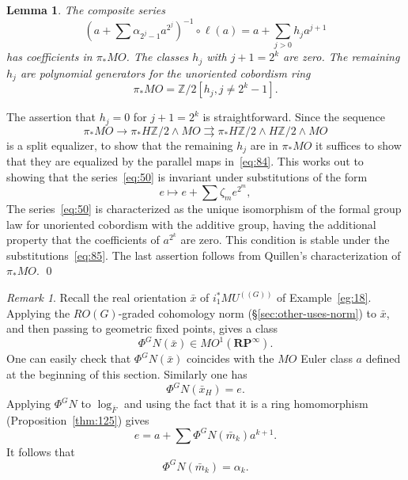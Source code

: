 \documentclass{amsart}
\newtheorem{lem}[equation]{Lemma}
\newtheorem{rem}[equation]{Remark}
\theoremstyle{definition}
\theoremstyle{remark}
\newtheorem{rem}[equation]{Remark}
\newenvironment{pf}{\bigskip{\em Proof:\/}}{\qed\medskip}
\newcommand{\Z}{{\mathbb Z}}
\newcommand{\rp}{\mathbf{RP}}
\newcommand{\mutn}[1]{MU^{(\!(#1)\!)}}
\newcommand{\norm}{N}
\newcommand{\gfp}[1]{\Phi^{#1}}
\newcommand{\phig}{\gfp{G}}
\newcommand{\gbar}{\bar}
\begin{document}
\begin{lem}
\label{thm:178}
The composite series
\begin{equation}\label{eq:50}
(a+\sum \alpha_{2^{j}-1} a^{2^{j}})^{-1}\circ \ell(a) = a +
\sum_{j>0} h_{j}a^{j+1}
\end{equation}
has coefficients in $\pi_{\ast}MO$.  The classes $h_{j}$ with
$j+1=2^{k}$ are zero.  The remaining $h_{j}$ are polynomial generators
for the unoriented cobordism ring
\begin{equation}\label{eq:51}
\pi_{\ast} MO =\Z/2[h_{j}, j\ne 2^{k}-1].
\end{equation}
\end{lem}


\begin{pf}
The assertion that $h_{j}=0$ for $j+1=2^{k}$ is straightforward.
Since the sequence
\begin{equation}
\label{eq:84}
\pi_{\ast}MO\to \pi_{\ast}H\Z/2\wedge MO \rightrightarrows
\pi_{\ast}H\Z/2\wedge H\Z/2\wedge MO
\end{equation}
is a split equalizer, to show that the remaining $h_{j}$ are in
$\pi_{\ast}MO$ it suffices to show that they are equalized by the
parallel maps in~\eqref{eq:84}.  This works out to showing that the
series~\eqref{eq:50} is invariant under substitutions of the form
\begin{equation}\label{eq:85}
e \mapsto e+ \sum \zeta_{m} e^{2^{m}},
\end{equation}
The series~\eqref{eq:50} is characterized as the unique isomorphism of
the formal group law for unoriented cobordism with the additive group,
having the additional property that the coefficients of $a^{2^{k}}$
are zero.  This condition is stable under the
substitutions~\eqref{eq:85}.  The last assertion follows from
Quillen's characterization of $\pi_{\ast}MO$.
\end{pf}

\begin{rem}
\label{rem:21} Recall the real orientation $\gbar{x}$ of
$i_{1}^{\ast}\mutn{G}$ of Example~\ref{eg:18}.  Applying the
$RO(G)$-graded cohomology norm (\S\ref{sec:other-uses-norm}) to
$\gbar{x}$, and then passing to geometric fixed points, gives a class
\[
\phig\norm (\gbar{x}) \in MO^{1}(\rp^{\infty}).
\]
One can easily check that $\phig\norm(\gbar{x})$ coincides with the $MO$
Euler class $a$ defined at the beginning of this section.  Similarly
one has
\[
\phig\norm (\gbar{x}_{H})= e.
\]
Applying $\phig\norm$ to $\log_{\gbar{F}}$ and using the fact that it is
a ring homomorphism (Proposition~\ref{thm:125}) gives
\[
e = a+ \sum \phig\norm(\gbar{m}_{k}) a^{k+1}.
\]
It follows that
\[
\phig\norm(\gbar{m}_{k}) = \alpha_{k}.
\]
\end{rem}
\end{document}
